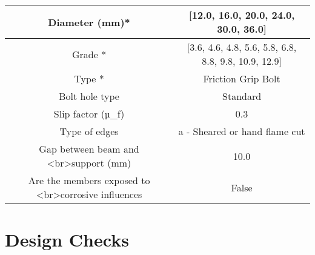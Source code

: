 \documentclass{article}%
\begin{document}
\begin{longtable}{|p{5cm}|p{2cm}|p{2cm}|p{2cm}|p{5cm}|}
\hline%
\hline%
\multicolumn{3}{|c|}{Diameter (mm)*}&\multicolumn{2}{|c|}{{[}12.0, 16.0, 20.0, 24.0, 30.0, 36.0{]}}\\%
\hline%
\hline%
\multicolumn{3}{|c|}{Grade *}&\multicolumn{2}{|c|}{{[}3.6, 4.6, 4.8, 5.6, 5.8, 6.8, 8.8, 9.8, 10.9, 12.9{]}}\\%
\hline%
\hline%
\multicolumn{3}{|c|}{Type *}&\multicolumn{2}{|c|}{Friction Grip Bolt}\\%
\hline%
\hline%
\multicolumn{3}{|c|}{Bolt hole type}&\multicolumn{2}{|c|}{Standard}\\%
\hline%
\hline%
\multicolumn{3}{|c|}{Slip factor (µ\_f)}&\multicolumn{2}{|c|}{0.3}\\%
\hline%
\hline%
\multicolumn{3}{|c|}{Type of edges}&\multicolumn{2}{|c|}{a {-} Sheared or hand flame cut}\\%
\hline%
\hline%
\multicolumn{3}{|c|}{Gap between beam and <br>support (mm)}&\multicolumn{2}{|c|}{10.0}\\%
\hline%
\hline%
\multicolumn{3}{|c|}{Are the members exposed to <br>corrosive influences}&\multicolumn{2}{|c|}{False}\\%
\hline%
\end{longtable}

%
%
\newpage%
\section{Design Checks}%
\label{sec:DesignChecks}%
\end{document}
